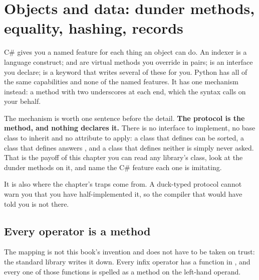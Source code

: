 
\chapter{Objects and data: dunder methods, equality, hashing, records}
\label{ch:objects}

\noindent
C\# gives you a named feature for each thing an object can do. An indexer
is a language construct;  and  are virtual
methods you override in pairs;  is an interface you
declare;  is a keyword that writes several of these for you.
Python has all of the same capabilities and none of the named features. It
has one mechanism instead: a method with two underscores at each end, which
the syntax calls on your behalf.

The mechanism is worth one sentence before the detail. \textbf{The protocol
is the method, and nothing declares it.} There is no interface to
implement, no base class to inherit and no attribute to apply: a class that
defines  can be sorted, a class that defines
 answers , and a class that defines neither is
simply never asked. That is the payoff of this chapter \dash{} you can read
any library's class, look at the dunder methods on it, and name the C\#
feature each one is imitating.

It is also where the chapter's traps come from. A duck-typed protocol
cannot warn you that you have half-implemented it, so the compiler that
would have told you is not there.

\section{Every operator is a method}
\label{sec:ch04-protocol}

The mapping is not this book's invention and does not have to be taken on
trust: the standard library writes it down. Every infix operator has a
function in , and every one of those functions is spelled as
a method on the left-hand operand.

